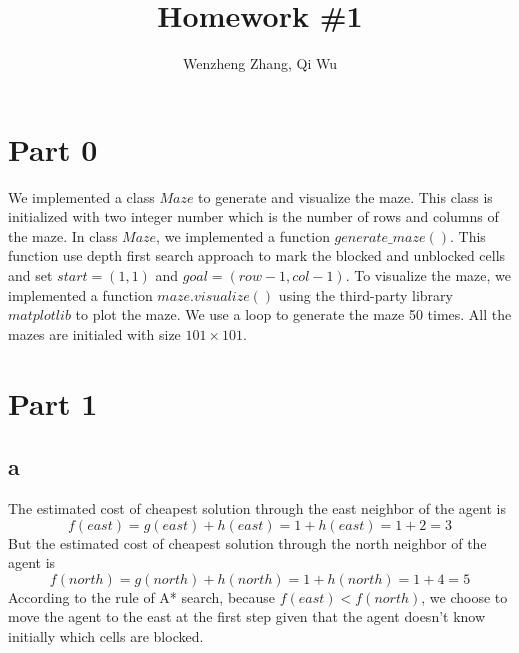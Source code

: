 \documentclass[11pt]{article}
\title{Homework \#1} %
\author{Wenzheng Zhang, Qi Wu} %
\begin{document}
\maketitle %

\section*{Part 0}
We implemented a class $Maze$ to generate and visualize the maze. This class is initialized with two integer number which is the number of rows and columns of the maze. In class $Maze$, we implemented a function $generate\_maze()$. This function use depth first search approach to mark the blocked and unblocked cells and set $start = (1, 1)$ and $goal = (row - 1, col - 1)$. To visualize the maze, we implemented a function $maze.visualize()$ using the third-party library $matplotlib$ to plot the maze. We use a loop to generate the maze 50 times. All the mazes are initialed with size $101\times 101$.



\section*{Part 1}





\subsection*{a}
 The estimated cost of cheapest solution through the east neighbor of the agent is
 $$f(east)=g(east)+h(east)=1+h(east)=1+2=3$$ 
 But the estimated cost of cheapest solution through the north neighbor of the agent is $$f(north)=g(north)+h(north)=1+h(north)=1+4=5$$ 
 According to the rule of A* search, because $f(east)<f(north)$, we choose to move the agent to  the east at the first step given that the agent doesn't know initially which cells are blocked.
\end{document}

